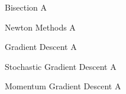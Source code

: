  \begin{frame}{Bisection}
    A
  \end{frame}

  \begin{frame}{Newton Methods}
    A
  \end{frame}

  \begin{frame}{Gradient Descent}
    A
  \end{frame}

  \begin{frame}{Stochastic Gradient Descent}
    A
  \end{frame}

  \begin{frame}{Momentum Gradient Descent}
    A
  \end{frame}

